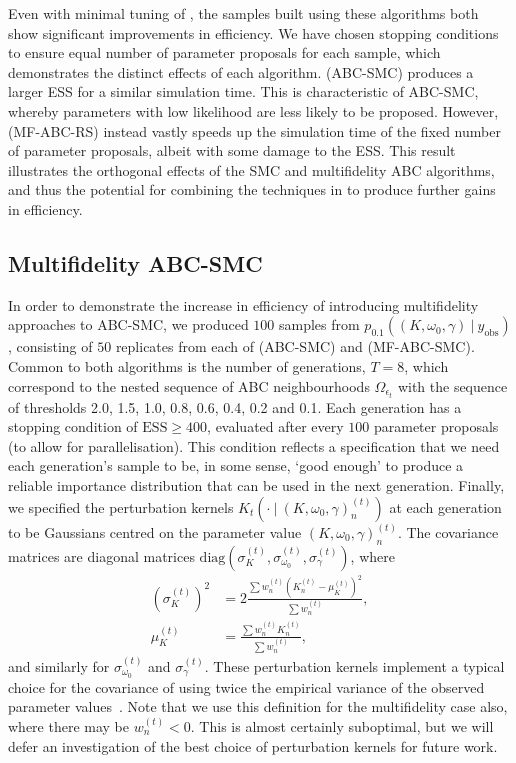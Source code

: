\documentclass[12pt, onecolumn]{article}
\newcommand{\obs}[1]{#1_{\mathrm{obs}}}
\begin{document}
Even with minimal tuning of , the samples built using these algorithms both show significant improvements in efficiency.
We have chosen stopping conditions to ensure equal number of parameter proposals for each sample, which demonstrates the distinct effects of each algorithm.
 (ABC-SMC) produces a larger ESS for a similar simulation time.
This is characteristic of ABC-SMC, whereby parameters with low likelihood are less likely to be proposed.
However,  (MF-ABC-RS) instead vastly speeds up the simulation time of the fixed number of parameter proposals, albeit with some damage to the ESS.
This result illustrates the orthogonal effects of the SMC and multifidelity ABC algorithms, and thus the potential for combining the techniques in  to produce further gains in efficiency.

\subsection{Multifidelity ABC-SMC}
\label{s:Results}

In order to demonstrate the increase in efficiency of introducing multifidelity approaches to ABC-SMC, we produced $100$ samples from $p_{0.1}((K, \omega_0, \gamma)~|~\obs y)$, consisting of $50$ replicates from each of  (ABC-SMC) and  (MF-ABC-SMC).
Common to both algorithms is the number of generations, $T=8$, which correspond to the nested sequence of ABC neighbourhoods $\Omega_{\epsilon_t}$ with the sequence of thresholds 2.0, 1.5, 1.0, 0.8, 0.6, 0.4, 0.2 and 0.1.
Each generation has a stopping condition of $\mathrm{ESS} \geq 400$, evaluated after every $100$ parameter proposals (to allow for parallelisation).
This condition reflects a specification that we need each generation's sample to be, in some sense, `good enough' to produce a reliable importance distribution that can be used in the next generation.
Finally, we specified the perturbation kernels $K_t(\cdot~|~(K, \omega_0, \gamma)^{(t)}_n)$ at each generation to be Gaussians centred on the parameter value $(K, \omega_0, \gamma)^{(t)}_n$.
The covariance matrices are diagonal matrices $\mathrm{diag}(\sigma_K^{(t)}, \sigma_{\omega_0}^{(t)}, \sigma_\gamma^{(t)})$, where 
\begin{align*}
(\sigma_K^{(t)})^2 &= 2 \frac{\sum w_n^{(t)} (K_n^{(t)} - \mu_K^{(t)})^2}{\sum w_n^{(t)}}, \\
\mu_K^{(t)} &= \frac{\sum w_n^{(t)} K_n^{(t)} }{\sum w_n^{(t)}},
\end{align*}
and similarly for $\sigma_{\omega_0}^{(t)}$ and $\sigma_\gamma^{(t)}$.
These perturbation kernels implement a typical choice for the covariance of using twice the empirical variance of the observed parameter values~\cite{Beaumont2009,Filippi2013}.
Note that we use this definition for the multifidelity case also, where there may be $w^{(t)}_n<0$.
This is almost certainly suboptimal, but we will defer an investigation of the best choice of perturbation kernels for future work.
\end{document}
